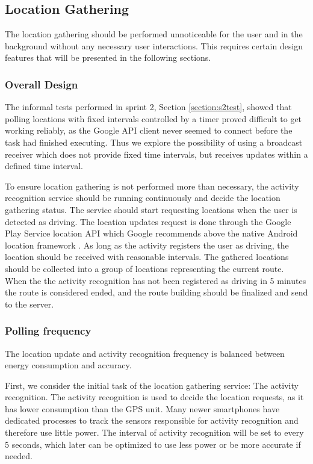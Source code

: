 \subsection{Location Gathering}\label{section:s3locgath}
The location gathering should be performed unnoticeable for the user and in the background without any necessary user interactions. 
This requires certain design features that will be presented in the following sections. 


\subsubsection{Overall Design}
The informal tests performed in sprint 2, Section \ref{section:s2test}, showed that polling locations with fixed intervals controlled by a timer proved difficult to get working reliably, as the Google API client never seemed to connect before the task had finished executing. 
Thus we explore the possibility of using a broadcast receiver which does not provide fixed time intervals, but receives updates within a defined time interval.

To ensure location gathering is not performed more than necessary, the activity recognition service should be running continuously and decide the location gathering status.
The service should start requesting locations when the user is detected as driving. 
The location updates request is done through the Google Play Service location API which Google recommends above the native Android location framework \cite{apploc}.
As long as the activity registers the user as driving, the location should be received with reasonable intervals.
The gathered locations should be collected into a group of locations representing the current route.
When the the activity recognition has not been registered as driving in 5 minutes the route is considered ended, and the route building should be finalized and send to the server.

\subsubsection{Polling frequency}
The location update and activity recognition frequency is balanced between energy consumption and accuracy.

First, we consider the initial task of the location gathering service: The activity recognition.
The activity recognition is used to decide the location requests, as it has lower consumption than the GPS unit. 
Many newer smartphones  have dedicated processes to track the sensors responsible for activity recognition and therefore use little power.
The interval of activity recognition will be set to every 5 seconds, which later can be optimized to use less power or be more accurate if needed.

